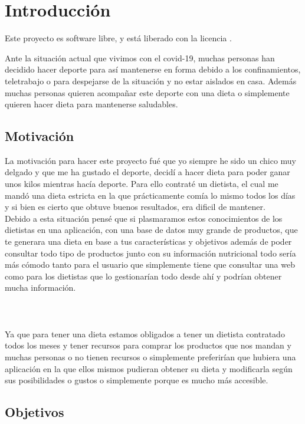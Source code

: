 \chapter{Introducción}

Este proyecto es software libre, y está liberado con la licencia \cite{gplv3}.

Ante la situación actual que vivimos con el covid-19, muchas personas han decidido hacer deporte 
para así mantenerse en forma debido a los confinamientos, teletrabajo o para despejarse de la 
situación y no estar aislados en casa. Además muchas personas quieren acompañar este deporte con una dieta o simplemente quieren hacer 
dieta para mantenerse saludables.

\section{Motivación}

La motivación para hacer este proyecto fué que yo siempre he sido un chico muy delgado y que 
me ha gustado el deporte, decidí a hacer dieta para poder ganar unos kilos mientras hacía deporte.
Para ello contraté un dietista, el cual me mandó una dieta estricta en la que prácticamente comía lo mismo 
todos los días y si bien es cierto que obtuve buenos resultados, era dificil de mantener. \\

Debido a esta situación pensé que si plasmaramos estos conocimientos de los dietistas en una aplicación, con una base de datos 
muy grande de productos, que te generara una dieta en base a tus características y objetivos 
además de poder consultar todo tipo de productos junto con su información nutricional todo sería más cómodo tanto para
el usuario que simplemente tiene que consultar una web como para los dietistas que lo gestionarían todo desde ahí
y podrían obtener mucha información. \\ \\
\\\\
Ya que para tener una dieta estamos obligados a tener un dietista contratado todos los meses y tener recursos para 
comprar los productos que nos mandan y muchas personas o no tienen recursos o simplemente preferirían
que hubiera una aplicación en la que ellos mismos pudieran obtener su dieta y modificarla según sus 
posibilidades o gustos o simplemente porque es mucho más accesible.

\section{Objetivos}

